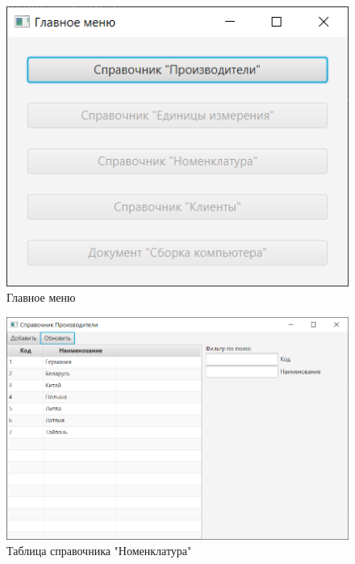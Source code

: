 \documentclass[12pt, a4paper, simple]{eskdtext}
\begin{document}
    \begin{figure}[!ph]
        \centering
        \includegraphics[]
            {_assets/View-Main.png}
        \caption{Главное меню}
        \label{fig:View-Main}
    \end{figure}

    \begin{figure}[!ph]
        \centering
        \includegraphics[width=16cm]
            {_assets/View-Table-Producer.png}
        \caption{Таблица справочника "Номенклатура"}
        \label{fig:View-Table-Producer}
    \end{figure}
\end{document}
